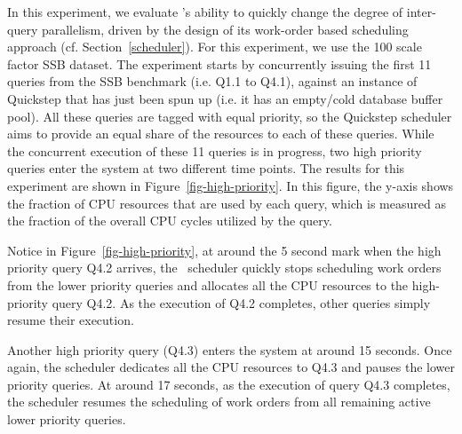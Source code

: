 In this experiment, we evaluate \Quickstep's ability to quickly change the degree of inter-query parallelism, driven by the design of its work-order based scheduling approach (cf. Section~\ref{scheduler}). For this experiment, we use the 100 scale factor SSB dataset. The experiment starts by concurrently issuing the first 11 queries from the SSB benchmark (i.e. Q1.1 to Q4.1), against an instance of Quickstep that has just been spun up (i.e. it has an empty/cold database buffer pool).
All these queries are tagged with equal priority, so the Quickstep scheduler aims to provide an equal share of the resources to each of these queries. While the concurrent execution of these 11 queries is in progress, two high priority queries enter the system at two different time points. The results for this experiment are shown in Figure~\ref{fig-high-priority}.
In this figure, the y-axis shows the fraction of CPU resources that are used by each query, which is measured as the fraction of the overall CPU cycles utilized by the query.

Notice in Figure~\ref{fig-high-priority}, at around the 5 second mark when the high priority query Q4.2 arrives, the \Quickstep\ scheduler quickly stops scheduling work orders from the lower priority queries and allocates all the CPU resources to the high-priority query Q4.2.
As the execution of Q4.2 completes, other queries simply resume their execution.

Another high priority query (Q4.3) enters the system at around 15 seconds.
Once again, the scheduler dedicates all the CPU resources to Q4.3 and pauses the lower priority queries.
At around 17 seconds, as the execution of query Q4.3 completes, the scheduler resumes the scheduling of work orders from all remaining active lower priority queries.

